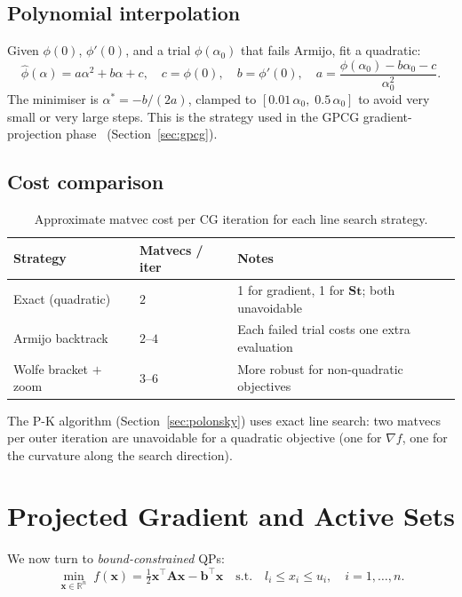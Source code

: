 \documentclass[11pt,a4paper]{article}
\newcommand{\R}{\mathbb{R}}
\newcommand{\bA}{\mathbf{A}}
\newcommand{\bS}{\mathbf{S}}
\newcommand{\bb}{\mathbf{b}}
\newcommand{\bt}{\mathbf{t}}
\newcommand{\bx}{\mathbf{x}}
\newcommand{\tr}{\top}
\begin{document}
\subsection{Polynomial interpolation}

Given $\phi(0)$, $\phi'(0)$, and a trial $\phi(\alpha_0)$ that fails
Armijo, fit a quadratic:
\[
  \hat\phi(\alpha) = a\alpha^2 + b\alpha + c, \quad
  c = \phi(0),\quad b = \phi'(0),\quad
  a = \frac{\phi(\alpha_0) - b\alpha_0 - c}{\alpha_0^2}.
\]
The minimiser is $\alpha^* = -b/(2a)$, clamped to $[0.01\,\alpha_0,\; 0.5\,\alpha_0]$
to avoid very small or very large steps.  This is the strategy used in the
GPCG gradient-projection phase~\cite{MoreToraldo1991} (Section~\ref{sec:gpcg}).

\subsection{Cost comparison}

\begin{table}[ht]
\centering
\caption{Approximate matvec cost per CG iteration for each line search strategy.}
\label{tab:ls-cost}
\begin{tabular}{@{}lll@{}}
\toprule
Strategy & Matvecs / iter & Notes \\
\midrule
Exact (quadratic)       & $2$ & 1 for gradient, 1 for $\bS\bt$; both unavoidable \\
Armijo backtrack        & $2$--$4$ & Each failed trial costs one extra evaluation \\
Wolfe bracket $+$ zoom  & $3$--$6$ & More robust for non-quadratic objectives \\
\bottomrule
\end{tabular}
\end{table}

The P-K algorithm (Section~\ref{sec:polonsky}) uses exact line search:
two matvecs per outer iteration are unavoidable for a quadratic objective
(one for $\nabla f$, one for the curvature along the search direction).

\section{Projected Gradient and Active Sets}
\label{sec:projection}

We now turn to \emph{bound-constrained} QPs:
\begin{equation}
  \min_{\bx \in \R^n}\; f(\bx) = \tfrac{1}{2}\bx^\tr\bA\bx - \bb^\tr\bx
  \quad \text{s.t.}\quad l_i \leq x_i \leq u_i,\quad i = 1,\ldots,n.
  \label{eq:bqp}
\end{equation}
\end{document}
